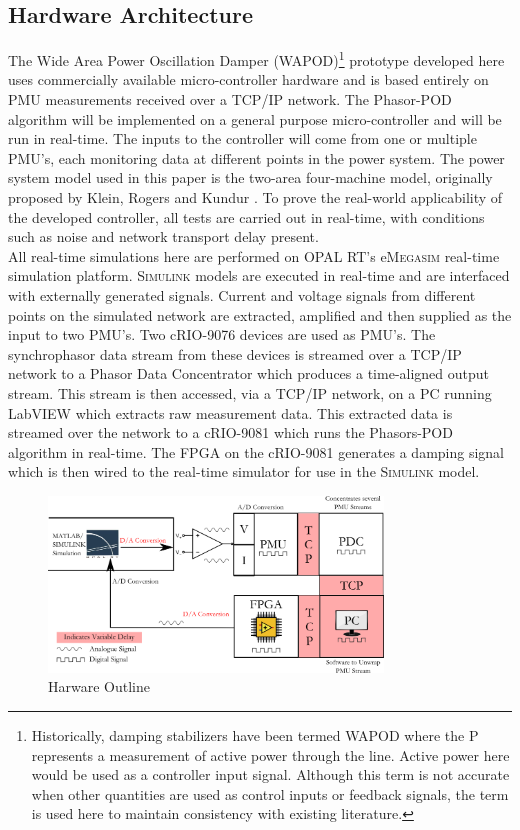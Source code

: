 \documentclass[journal]{IEEEtran}
\begin{document}
\subsection{Hardware Architecture}

The Wide Area Power Oscillation Damper (WAPOD)\footnote{Historically, damping stabilizers have been termed WAPOD where the P represents a measurement of active power through the line. Active power here would be used as a controller input signal. Although this term is not accurate when other quantities are used as control inputs or feedback signals, the term is used here to maintain consistency with existing literature.} prototype developed here uses commercially available micro-controller hardware and is based entirely on PMU measurements received over a TCP/IP network. The Phasor-POD algorithm \cite{PhasorPOD} will be implemented on a general purpose micro-controller and will be run in real-time. The inputs to the controller will come from one or multiple PMU's, each monitoring data at different points in the power system. The power system model used in this paper is the two-area four-machine model, originally proposed by Klein, Rogers and Kundur \cite{KundurTwoArea}. To prove the real-world applicability of the developed controller, all tests are carried out in real-time, with conditions such as noise and network transport delay present.\\

All real-time simulations here are performed on OPAL RT's e\textsc{Megasim} \cite{OPALemegasim} real-time simulation platform. \textsc{Simulink} models are executed in real-time and are interfaced with externally generated signals. Current and voltage signals from different points on the simulated network are extracted, amplified and then supplied as the input to two PMU's. Two cRIO-9076 \cite{cRIO9076} devices are used as PMU's. The synchrophasor data stream from these devices is streamed over a TCP/IP network to a Phasor Data Concentrator which produces a time-aligned output stream. This stream is then accessed, via a TCP/IP network, on a PC running LabVIEW which extracts raw measurement data. This extracted data is streamed over the network to a cRIO-9081 which runs the Phasors-POD algorithm in real-time. The FPGA on the cRIO-9081 \cite{cRIO9081} generates a damping signal which is then wired to the real-time simulator for use in the \textsc{Simulink} model.\\

\begin{figure}[!h]
\centering
\includegraphics[width=3.5in]{DataFlow.png} 
\caption{Harware Outline}
\label{Hardware_Outline}
\end{figure}
\end{document}
